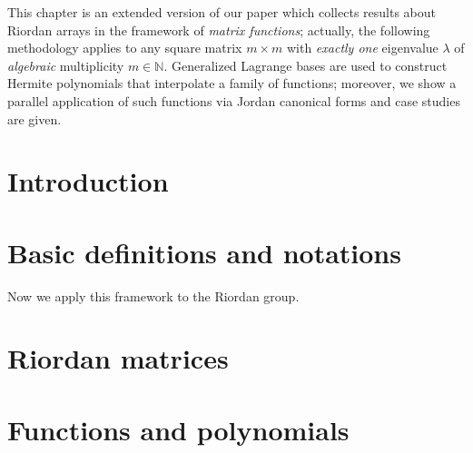 


This chapter is an extended version of our paper
\citep{Merlini:Nocentini:matrices:functions} which collects results about
Riordan arrays in the framework of \textit{matrix functions};  actually,
the following methodology applies to any square matrix $m\times m$ with
\textit{exactly one} eigenvalue $\lambda$ of \textit{algebraic}
multiplicity $m \in\mathbb{N}$.  Generalized Lagrange bases are used to
construct Hermite polynomials that interpolate a family of functions;
moreover, we show a parallel application of such functions via Jordan
canonical forms and case studies are given.


\section{Introduction}

\label{sec:matrices:functions:introduction}


\section{Basic definitions and notations}



Now we apply this framework to the Riordan group.

\section{Riordan matrices}



\iffalse %



\subsection{A component matrices characterization of Hermite interpolating polynomials}


\fi

\section{Functions and polynomials}

